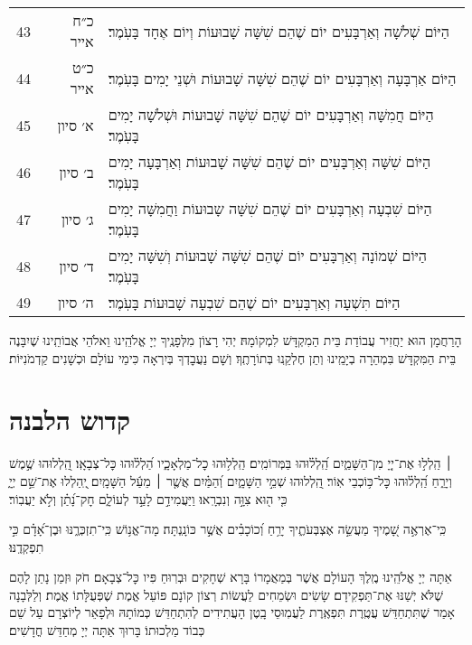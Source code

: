 \documentclass[twoside, openany, parskip=half, 11pt]{book}
\begin{document}
\begin{scriptsize}
\begin{longtable}{ l | r | p{} }
43 & כ״ח אייר & הַיּוֹם שְׁלֹשָׁה וְאַרְבָּעִים יוֹם שֶׁהֵם שִׁשָּׁה שָׁבוּעוֹת וְיוֹם אֶחָד בָּעֹֽמֶר׃ \\
44 & כ״ט אייר & הַיּוֹם אַרְבָּעָה וְאַרְבָּעִים יוֹם שֶׁהֵם שִׁשָּׁה שָׁבוּעוֹת וּשְׁנֵי יָמִים בָּעֹֽמֶר׃ \\
45 & א׳ סיון & הַיּוֹם חֲמִשָּׁה וְאַרְבָּעִים יוֹם שֶׁהֵם שִׁשָּׁה שָׁבוּעוֹת וּשְׁלֹשָׁה יָמִים בָּעֹֽמֶר׃ \\
46 & ב׳ סיון & הַיּוֹם שִׁשָּׁה וְאַרְבָּעִים יוֹם שֶׁהֵם שִׁשָּׁה שָׁבוּעוֹת וְאַרְבָּעָה יָמִים בָּעֹֽמֶר׃ \\
47 & ג׳ סיון & הַיּוֹם שִׁבְעָה וְאַרְבָּעִים יוֹם שֶׁהֵם שִׁשָּׁה שָבוּעוֹת וַחֲמִשָּׁה יָמִים בָּעֹֽמֶר׃ \\
48 & ד׳ סיון & הַיּוֹם שְׁמוֹנָה וְאַרְבָּעִים יוֹם שֶׁהֵם שִׁשָּׁה שָׁבוּעוֹת וְשִׁשָּׁה יָמִים בָּעֹֽמֶר׃ \\
49 & ה׳ סיון & הַיּוֹם תִּשְׁעָה וְאַרְבָּעִים יוֹם שֶׁהֵם שִׁבְעָה שָׁבוּעוֹת בָּעֹֽמֶר׃
\end{longtable}
\end{scriptsize}



הָרַחֲמָן הוּא יַחֲזִיר עֲבוֹדַת בֵּית הַמִקְדָּשׁ לִמְקוֹמָהּ׃
יְהִי רָצוֹן מִלְּפָנֶֽיךָ יְיָ אֱלֹהֵֽינוּ וֵאלֹהֵי אֲבוֹתֵֽינוּ שֶׁיִבָּנֶה בֵּית הַמִּקְדָּשׁ בִּמְהֵרָה בְיָמֵֽינוּ וְתֵן חֶלְקֵֽנוּ בְּתוֹרָתֶֽךָ׃ וְשָׁם נַעֲבׇדְךָ בְּיִרְאָה כִּימֵי עוֹלָם וּכְשָׁנִים קַדְמֹנִיּוֹת׃

\lamenatzeachbinginot

\section[קדוש הלבנה]{ קדוש הלבנה }

׀ הַֽלְל֣וּ אֶת־יְיָ֭ מִן־הַשָּׁמַ֑יִם הַֽ֝לְל֗וּהוּ בַּמְּרוֹמִֽים׃
הַֽלְל֥וּהוּ כׇל־מַלְאָכָ֑יו הַ֝לְל֗וּהוּ כׇּל־צְבָאָֽו׃
הַֽ֭לְלוּהוּ שֶׁ֣מֶשׁ וְיָרֵ֑חַ הַֽ֝לְל֗וּהוּ כׇּל־כּ֥וֹכְבֵי אֽוֹר׃
הַֽ֭לְלוּהוּ שְׁמֵ֣י הַשָּׁמָ֑יִם וְ֝הַמַּ֗יִם אֲשֶׁ֤ר ׀ מֵעַ֬ל הַשָּׁמָֽיִם׃
יְֽ֭הַלְלוּ אֶת־שֵׁ֣ם יְיָ֑ כִּ֤י ה֖וּא צִוָּ֣ה וְנִבְרָֽאוּ׃
וַיַּעֲמִידֵ֣ם לָעַ֣ד לְעוֹלָ֑ם חׇק־נָ֝תַ֗ן וְלֹ֣א יַעֲבֽוֹר׃

כִּֽי־אֶרְאֶ֣ה שָׁ֭מֶיךָ מַעֲשֵׂ֣ה אֶצְבְּעֹתֶ֑יךָ יָרֵ֥חַ וְ֝כוֹכָבִ֗ים אֲשֶׁ֣ר כּוֹנָֽנְתָּה׃
מָה־אֱנ֥וֹשׁ כִּֽי־תִזְכְּרֶ֑נּוּ וּבֶן־אָ֝דָ֗ם כִּ֣י תִפְקְדֶֽנּוּ׃

\begin{large}
אַתָּה יְיָ אֱלֹהֵֽינוּ מֶֽלֶךְ הָעוֹלָם אֲשֶׁר בְּמַאֲמָרוֹ בָּרָא שְׁחָקִים וּבְרֽוּחַ פִּיו כׇּל־צְבָאָם׃ חֹק וּזְמַן נָתַן לָהֶם שֶׁלֹּא יְשַׁנּוּ אֶת־תַּפְקִידָם׃ שָׂשִׂים וּשְׂמֵחִים לַעֲשׂוֹת רְצוֹן קוֹנָם פּוֹעֵל אֱמֶת שֶׁפְּעֻלָּתוֹ אֱמֶת׃ וְלַלְּבָנָה אָמַר שֶׁתִּתְחַדֵּשׁ עֲטֶֽרֶת תִּפְאֶֽרֶת לַעֲמֽוּסֵי בָֽטֶן הָעֲתִידִים לְהִתְחַדֵּשׁ כְּמוֹתָהּ וּלְפָאֵר לְיוֹצְרָם עַל שֵׁם כְּבוֹד מַלְכוּתוֹ׃ בָּרוּךְ אַתָּה יְיָ מְחַדֵּשׁ חֳדָשִׁים׃
\end{large}
\end{document}
